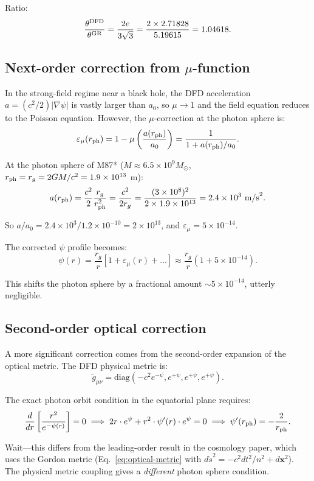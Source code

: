 \documentclass[11pt]{article}
\newcommand{\ee}[1]{\times 10^{#1}}
\begin{document}
Ratio:
\[
\frac{\theta^{\rm DFD}}{\theta^{\rm GR}} = \frac{2e}{3\sqrt{3}} = \frac{2 \times 2.71828}{5.19615} = 1.04618.
\]

\subsection{Next-order correction from $\mu$-function}

In the strong-field regime near a black hole, the DFD acceleration $a = (c^2/2)|\nabla\psi|$ is vastly larger than $a_0$, so $\mu \to 1$ and the field equation reduces to the Poisson equation. However, the $\mu$-correction at the photon sphere is:
\[
\varepsilon_\mu(r_{\rm ph}) = 1 - \mu\left(\frac{a(r_{\rm ph})}{a_0}\right) = \frac{1}{1 + a(r_{\rm ph})/a_0}.
\]

At the photon sphere of M87* ($M \approx 6.5\ee{9} M_\odot$, $r_{\rm ph} = r_g = 2GM/c^2 = 1.9\ee{13}$ m):
\[
a(r_{\rm ph}) = \frac{c^2}{2} \frac{r_g}{r_{\rm ph}^2} = \frac{c^2}{2r_g} = \frac{(3\ee{8})^2}{2 \times 1.9\ee{13}} = 2.4\ee{3}\text{ m/s}^2.
\]

So $a/a_0 = 2.4\ee{3}/1.2\ee{-10} = 2\ee{13}$, and $\varepsilon_\mu = 5\ee{-14}$.

The corrected $\psi$ profile becomes:
\[
\psi(r) = \frac{r_g}{r}\left[1 + \varepsilon_\mu(r) + \ldots\right] \approx \frac{r_g}{r}\left(1 + 5\ee{-14}\right).
\]

This shifts the photon sphere by a fractional amount $\sim 5\ee{-14}$, utterly negligible.

\subsection{Second-order optical correction}

A more significant correction comes from the second-order expansion of the optical metric. The DFD physical metric is:
\[
\tilde{g}_{\mu\nu} = \text{diag}(-c^2 e^{-\psi}, e^{+\psi}, e^{+\psi}, e^{+\psi}).
\]

The exact photon orbit condition in the equatorial plane requires:
\[
\frac{d}{dr}\left[\frac{r^2}{e^{-\psi(r)}}\right] = 0 \implies 2r \cdot e^{\psi} + r^2 \cdot \psi'(r) \cdot e^{\psi} = 0 \implies \psi'(r_{\rm ph}) = -\frac{2}{r_{\rm ph}}.
\]

Wait---this differs from the leading-order result in the cosmology paper, which uses the Gordon metric (Eq.~\ref{eq:optical-metric} with $d\tilde{s}^2 = -c^2 dt^2/n^2 + d\mathbf{x}^2$). The physical metric coupling gives a \emph{different} photon sphere condition.
\end{document}
